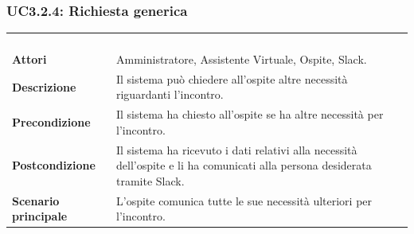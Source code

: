 \subsubsection{UC3.2.4: Richiesta generica}
\label{UC3.2.4}
\begin{longtable}{l|p{10cm}}
	\rowcolor[gray]{0.8} \multicolumn{2}{c}{} \\
	\rowcolor[gray]{0.8} \multicolumn{2}{c}{\textbf{UC3.2.4 - Richiesta generica}} \\
	\rowcolor[gray]{0.8} \multicolumn{2}{c}{} \\
	\hline
	&\\
	\textbf{Attori} & Amministratore, Assistente Virtuale, Ospite, Slack.\\[7pt]
	\textbf{Descrizione} & Il sistema può chiedere all'ospite altre necessità riguardanti l'incontro.\\[7pt]
	\textbf{Precondizione} & Il sistema ha chiesto all'ospite se ha altre necessità per l'incontro.\\[7pt]
	\textbf{Postcondizione} & Il sistema ha ricevuto i dati relativi alla necessità dell'ospite e li ha comunicati alla persona desiderata tramite Slack.\\[7pt]
	\textbf{Scenario principale} &L'ospite comunica tutte le sue necessità ulteriori per l'incontro.\\[7pt]\hline
\end{longtable}

